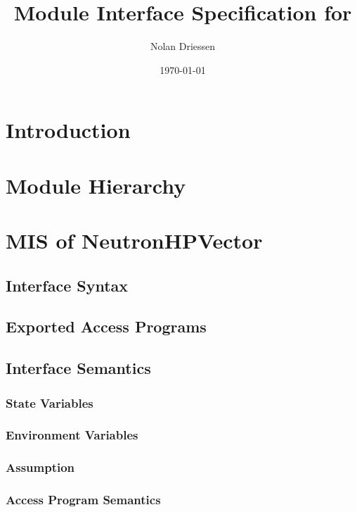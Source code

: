 \documentclass[12pt]{article}
\begin{document}
\title{Module Interface Specification for } 
\author{Nolan Driessen}
\date{\today}
	
\maketitle

\tableofcontents
 
\section{Introduction}%


\section{Module Hierarchy}%


\section{MIS of NeutronHPVector}

\subsection{Interface Syntax}%

\subsection{Exported Access Programs}%


\subsection{Interface Semantics}

\subsubsection{State Variables}%

\subsubsection{Environment Variables}%

\subsubsection{Assumption}%

\subsubsection{Access Program Semantics}%
\end{document}

